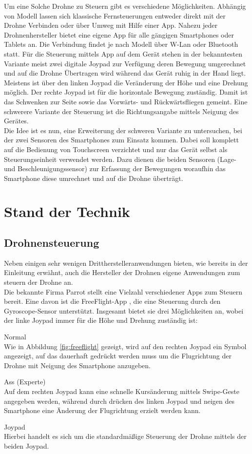 \documentclass{article}
\begin{document}
Um eine Solche Drohne zu Steuern gibt es verschiedene Möglichkeiten. Abhängig von Modell lassen sich klassische Fernsteuerungen\cite{flypad} entweder direkt mit der Drohne Verbinden oder über Umweg mit Hilfe einer App. Nahezu jeder Drohnenhersteller bietet eine eigene App für alle gängigen Smartphones oder Tablets an. Die Verbindung findet je nach Modell über W-Lan oder Bluetooth statt. Für die Steuerung mittels App auf dem Gerät stehen in der bekanntesten Variante meist zwei digitale Joypad zur Verfügung deren Bewegung umgerechnet und auf die Drohne Übertragen wird während das Gerät ruhig in der Hand liegt. Meistens ist über den linken Joypad die Veränderung der Höhe und eine Drehung möglich. Der rechte Joypad ist für die horizontale Bewegung zuständig. Damit ist das Schwenken zur Seite sowie das Vorwärts- und Rückwärtsfliegen gemeint. Eine schwerere Variante der Steuerung ist die Richtungsangabe mittels Neigung des Gerätes.
\\ Die Idee ist es nun, eine Erweiterung der schweren Variante zu untersuchen, bei der zwei Sensoren des Smartphones zum Einsatz kommen. Dabei soll komplett auf die Bedienung von Touchscreen verzichtet und nur das Gerät selbst als Steuerungseinheit verwendet werden. Dazu dienen die beiden Sensoren (Lage- und Beschleunigungssensor) zur Erfassung der Bewegungen\cite{milker2012bewegungserkennung} woraufhin das Smartphone diese umrechnet und auf die Drohne überträgt. 

\section{Stand der Technik}
\label{sec:verwandteArbeiten}
\subsection{Drohnensteuerung}
Neben einigen sehr wenigen Drittherstelleranwendungen bieten, wie bereits in der Einleitung erwähnt, auch die Hersteller der Drohnen eigene Anwendungen zum steuern der Drohne an.
\\ Die bekannte Firma Parrot stellt eine Vielzahl verschiedener Apps zum Steuern bereit. Eine davon ist die FreeFlight-App \cite{freeflightapp}, die eine Steuerung durch den Gyroscope-Sensor unterstützt. Insgesamt bietet sie drei Möglichkeiten an, wobei der linke Joypad immer für die Höhe und Drehung zuständig ist:
\begin{description}
\item Normal \\
Wie in Abbildung \ref{fig:freeflight} gezeigt, wird auf den rechten Joypad ein Symbol angezeigt, auf das dauerhaft gedrückt werden muss um die Flugrichtung der Drohne mit Neigung des Smartphone anzugeben.
\item Ass (Experte) \\
Auf dem rechten Joypad kann eine schnelle Kursänderung mittels Swipe-Geste angegeben werden, während durch drücken des linken Joypad und neigen des Smartphone eine Änderung der Flugrichtung erzielt werden kann.
\item Joypad\\
Hierbei handelt es sich um die standardmäßige Steuerung der Drohne mittels der beiden Joypad.
\end{description}
\end{document}
